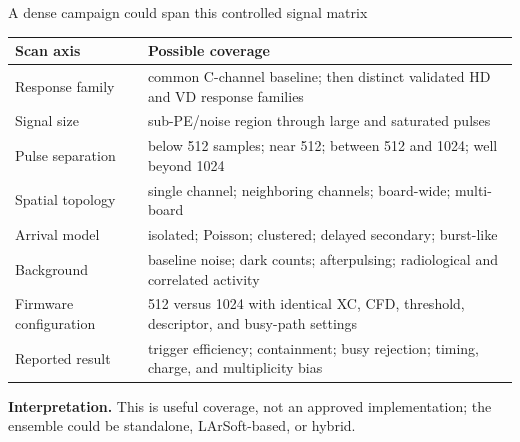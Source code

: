 \documentclass[aspectratio=169,11pt]{beamer}
\begin{document}
\begin{frame}{A dense campaign could span this controlled signal matrix}
  \footnotesize
  \renewcommand{\arraystretch}{1.08}
  \begin{tabular}{@{}p{}p{}@{}}
    \toprule
    Scan axis & Possible coverage \\
    \midrule
    Response family & common C-channel baseline; then distinct validated HD and VD response families \\
    Signal size & sub-PE/noise region through large and saturated pulses \\
    Pulse separation & below 512 samples; near 512; between 512 and 1024; well beyond 1024 \\
    Spatial topology & single channel; neighboring channels; board-wide; multi-board \\
    Arrival model & isolated; Poisson; clustered; delayed secondary; burst-like \\
    Background & baseline noise; dark counts; afterpulsing; radiological and correlated activity \\
    Firmware configuration & 512 versus 1024 with identical XC, CFD, threshold, descriptor, and busy-path settings \\
    Reported result & trigger efficiency; containment; busy rejection; timing, charge, and multiplicity bias \\
    \bottomrule
  \end{tabular}

  \medskip
  {\color{DuneTextMuted}\textbf{Interpretation.} This is useful coverage, not an approved implementation; the ensemble could be standalone, LArSoft-based, or hybrid.\par}
\end{frame}
\end{document}

